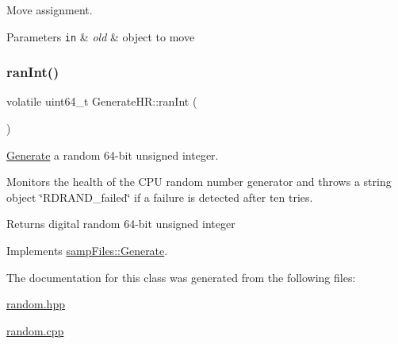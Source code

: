 Move assignment. 


\begin{DoxyParams}[1]{Parameters}
\mbox{\tt in}  & {\em old} & object to move \\
\hline
\end{DoxyParams}
\mbox{\label{classsamp_files_1_1_generate_h_r_ac0c560c9ea17bc67470124040e0bd796}} 
\subsubsection{\texorpdfstring{ran\+Int()}{ranInt()}}
{\footnotesize\ttfamily volatile uint64\+\_\+t Generate\+H\+R\+::ran\+Int (\begin{DoxyParamCaption}{ }\end{DoxyParamCaption})\hspace{0.3cm}{\ttfamily [virtual]}}



\hyperlink{classsamp_files_1_1_generate}{Generate} a random 64-\/bit unsigned integer. 

Monitors the health of the C\+PU random number generator and throws a {\ttfamily string} object \char`\"{}\+R\+D\+R\+A\+N\+D\+\_\+failed\char`\"{} if a failure is detected after ten tries.

\begin{DoxyReturn}{Returns}
digital random 64-\/bit unsigned integer 
\end{DoxyReturn}


Implements \hyperlink{classsamp_files_1_1_generate_a86fe4e68cc0809d4d936615fc60c125e}{samp\+Files\+::\+Generate}.



The documentation for this class was generated from the following files\+:\begin{DoxyCompactItemize}
\item 
\hyperlink{random_8hpp}{random.\+hpp}\item 
\hyperlink{random_8cpp}{random.\+cpp}\end{DoxyCompactItemize}
